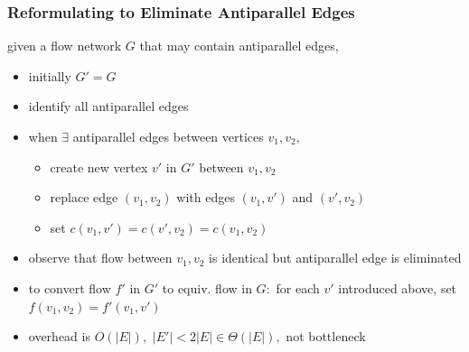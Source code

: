 \documentclass{beamer}
\begin{document}
\begin{frame} \frametitle{Reformulating to Eliminate Antiparallel Edges}
given a flow network $G$ that may contain antiparallel edges,
\begin{itemize}
  \item initially $G' = G$
  \item identify all antiparallel edges
  \item when $\exists$ antiparallel edges between vertices $v_1, v_2,$
  \begin{itemize}
    \item create new vertex $v'$ in $G'$ between $v_1, v_2$
    \item replace edge $(v_1, v_2)$ with edges $(v_1, v')$ and $(v', v_2)$
    \item set $c(v_1, v')=c(v', v_2)=c(v_1, v_2)$
  \end{itemize}
  \item observe that flow between $v_1, v_2$ is identical but antiparallel
    edge is eliminated
  \item to convert flow $f'$ in $G'$ to equiv. flow in $G:$ for each $v'$
    introduced above, set $f(v_1, v_2) = f'(v_1, v')$
  \item overhead is $O(|E|),$ $|E'| < 2|E| \in \Theta(|E|),$ not bottleneck
\end{itemize}
\end{frame}
\end{document}
